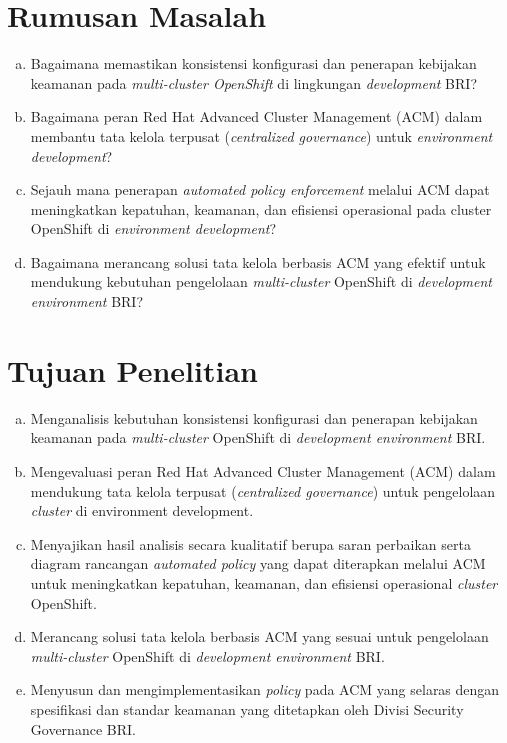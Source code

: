 \section{Rumusan Masalah}

\begin{adjustwidth}{0.5cm}{0cm}
  \begin{enumerate}[a.]
    \item Bagaimana memastikan konsistensi konfigurasi dan penerapan kebijakan keamanan pada \emph{multi-cluster OpenShift} di lingkungan \emph{development} BRI?
    \item Bagaimana peran Red Hat Advanced Cluster Management (ACM) dalam membantu tata kelola terpusat (\emph{centralized governance}) untuk \emph{environment development}?
    \item Sejauh mana penerapan \emph{automated policy enforcement} melalui ACM dapat meningkatkan kepatuhan, keamanan, dan efisiensi operasional pada cluster OpenShift di \emph{environment development}?
    \item Bagaimana merancang solusi tata kelola berbasis ACM yang efektif untuk mendukung kebutuhan pengelolaan \emph{multi-cluster} OpenShift di \emph{development environment} BRI?
  \end{enumerate}
\end{adjustwidth}

\section{Tujuan Penelitian}

\begin{adjustwidth}{0.5cm}{0cm}
  \begin{enumerate}[a.]
    \item Menganalisis kebutuhan konsistensi konfigurasi dan penerapan kebijakan keamanan pada \emph{multi-cluster} OpenShift di \emph{development environment} BRI.
    \item Mengevaluasi peran Red Hat Advanced Cluster Management (ACM) dalam mendukung tata kelola terpusat (\emph{centralized governance}) untuk pengelolaan \emph{cluster} di environment development.
    \item Menyajikan hasil analisis secara kualitatif berupa saran perbaikan serta diagram rancangan \emph{automated policy} yang dapat diterapkan melalui ACM untuk meningkatkan kepatuhan, keamanan, dan efisiensi operasional \emph{cluster} OpenShift.
    \item Merancang solusi tata kelola berbasis ACM yang sesuai untuk pengelolaan \emph{multi-cluster} OpenShift di \emph{development environment} BRI.
    \item Menyusun dan mengimplementasikan \emph{policy} pada ACM yang selaras dengan spesifikasi dan standar keamanan yang ditetapkan oleh Divisi Security Governance BRI.
  \end{enumerate}
\end{adjustwidth}

